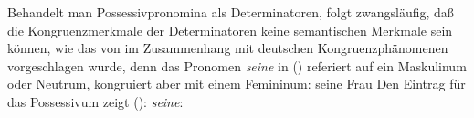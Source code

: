 Behandelt man Possessivpronomina als Determinatoren, folgt zwangsläufig, daß die Kongruenzmerkmale
der Determinatoren keine semantischen Merkmale sein können, wie das \zb von \citet[]{ps2}
im Zusammenhang mit deutschen Kongruenzphänomenen vorgeschlagen wurde, 
denn das Pronomen \emph{seine} in () referiert auf ein Maskulinum oder Neutrum, 
kongruiert aber mit einem Femininum:
\ea
seine Frau
\z
Den Eintrag für das Possessivum zeigt ():
\eas
\textit{seine}:\\
\label{le-seine-agr}
\zs
{}%

